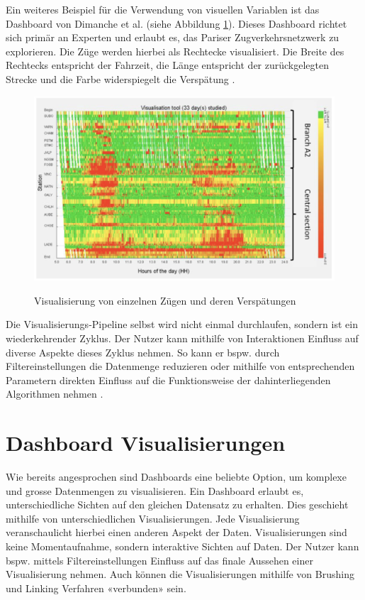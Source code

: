 Ein weiteres Beispiel für die Verwendung von visuellen Variablen ist das Dashboard von Dimanche et al. (siehe Abbildung \ref{fig_massive_railway_visualization}). Dieses Dashboard richtet sich primär an Experten und erlaubt es, das Pariser Zugverkehrsnetzwerk zu explorieren. Die Züge werden hierbei als Rechtecke visualisiert. Die Breite des Rechtecks entspricht der Fahrzeit, die Länge entspricht der zurückgelegten Strecke und die Farbe widerspiegelt die Verspätung \parencite{visualization_tool_operating_experts_2017}.

\begin{figure}[H]
    \caption{Visualisierung von einzelnen Zügen und deren Verspätungen \parencite[S. 15843]{visualization_tool_operating_experts_2017}}
    \includegraphics[width=.5\linewidth]{content/00_assets/massive_railway_visualization.png}
    \label{fig_massive_railway_visualization}
\end{figure}

Die Visualisierungs-Pipeline selbst wird nicht einmal durchlaufen, sondern ist ein wiederkehrender Zyklus. Der Nutzer kann mithilfe von Interaktionen Einfluss auf diverse Aspekte dieses Zyklus nehmen. So kann er bspw. durch Filtereinstellungen die Datenmenge reduzieren oder mithilfe von entsprechenden Parametern direkten Einfluss auf die Funktionsweise der dahinterliegenden Algorithmen nehmen \parencite[S.2971]{survey_traffic_data_visualization_2015}.

\section{Dashboard Visualisierungen}
Wie bereits angesprochen sind Dashboards eine beliebte Option, um komplexe und grosse Datenmengen zu visualisieren. Ein Dashboard erlaubt es, unterschiedliche Sichten auf den gleichen Datensatz zu erhalten. Dies geschieht mithilfe von unterschiedlichen Visualisierungen. Jede Visualisierung veranschaulicht hierbei einen anderen Aspekt der Daten. Visualisierungen sind keine Momentaufnahme, sondern interaktive Sichten auf Daten. Der Nutzer kann bspw. mittels Filtereinstellungen Einfluss auf das finale Aussehen einer Visualisierung nehmen. Auch können die Visualisierungen mithilfe von Brushing und Linking Verfahren «verbunden» sein. 

